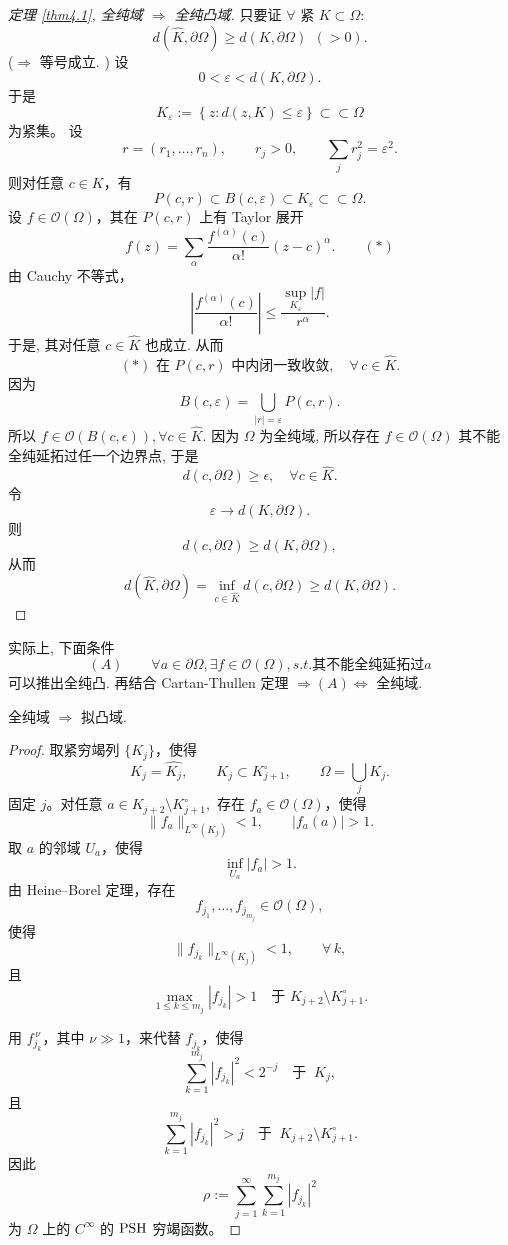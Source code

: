 \begin{proof}[定理 \ref{thm4.1}, 全纯域 $\Rightarrow $ 全纯凸域]
    只要证 $\forall $ 紧 $K \subset \Omega $: 
    $$ d(\hat{K},\partial \Omega )  \geq d(K,\partial \Omega )~~ (>0) .$$
    ($\Rightarrow $ 等号成立. )   
    设
\[
0<\varepsilon<d(K,\partial\Omega).
\]
于是
\[
K_\varepsilon
:=
\left\{
z:d(z,K)\leq\varepsilon
\right\}
\subset\subset\Omega
\]
为紧集。
设
\[
r=(r_1,\ldots,r_n),
\qquad
r_j>0,
\qquad
\sum_j r_j^2=\varepsilon^2.
\]
则对任意 \(c\in K\)，有
\[
P(c,r)\subset B(c,\varepsilon)\subset K_\varepsilon \subset \subset\Omega.
\]
设 \(f\in\mathcal{O}(\Omega)\)，其在 \(P(c,r)\) 上有 Taylor 展开
\[
f(z)
=
\sum_\alpha
\frac{f^{(\alpha)}(c)}{\alpha!}(z-c)^\alpha.
\qquad (*)
\]
由 Cauchy 不等式，
\[
\left|
\frac{f^{(\alpha)}(c)}{\alpha!}
\right|
\leq
\frac{\sup_{K_\varepsilon}|f|}{r^\alpha}.
\]
于是, 其对任意 \(c\in\widehat{K}\) 也成立. 从而
\[
(*)\text{ 在 }P(c,r)\text{ 中内闭一致收敛},
\quad
\forall\,c\in\widehat{K}.
\]
因为
\[
B(c,\varepsilon)
=
\bigcup_{|r|=\varepsilon}P(c,r).
\]
所以 $f \in \mathcal{O}(B(c,\epsilon )), \forall c \in \hat{K}$. 因为 $\Omega $ 为全纯域, 所以存在 $f \in \mathcal{O}(\Omega )$ 其不能全纯延拓过任一个边界点, 于是 
$$ d(c,\partial \Omega ) \geq \epsilon , \quad \forall c \in \hat{K}. $$  
令
\[
\varepsilon \to  d(K,\partial\Omega).
\]
则
\[
d(c,\partial\Omega)\geq d(K,\partial\Omega),
\]
从而
\[
d(\widehat{K},\partial\Omega)
=
\inf_{c\in\widehat{K}} d(c,\partial\Omega)
\geq
d(K,\partial\Omega).
\]
\end{proof}

\begin{remark}
    实际上, 下面条件 
    $$ (A) \qquad \forall a \in \partial \Omega , \exists f \in \mathcal{O}(\Omega ), s.t. \text{其不能全纯延拓过} a $$
    可以推出全纯凸. 再结合 Cartan-Thullen 定理 $\Rightarrow (A) \iff $ 全纯域. 
\end{remark}

\begin{proposition}
    全纯域 $\Rightarrow $ 拟凸域. 
\end{proposition}
\begin{proof}
取紧穷竭列 \(\{K_j\}\)，使得
\[
K_j=\widehat{K_j},
\qquad
K_j\subset K_{j+1}^{\circ},
\qquad
\Omega=\bigcup_j K_j.
\]
固定 \(j\)。对任意
\(
a\in K_{j+2}\setminus K_{j+1}^{\circ},
\)
存在 \(f_a\in\mathcal{O}(\Omega)\)，使得
\[
\|f_a\|_{L^\infty(K_j)}<1,
\qquad
|f_a(a)|>1.
\]
取 \(a\) 的邻域 \(U_a\)，使得
\[
\inf_{U_a}|f_a|>1.
\]
由 Heine--Borel 定理，存在
\[
f_{j_1},\ldots,f_{j_{m_j}}\in\mathcal{O}(\Omega),
\]
使得
\[
\|f_{j_k}\|_{L^\infty(K_j)}<1,
\qquad \forall\,k,
\]
且
\[
\max_{1\leq k\leq m_j}|f_{j_k}|>1
\quad\text{于 }K_{j+2}\setminus K_{j+1}^{\circ}.
\]

用 \(f_{j_k}^{\,\nu}\)，其中 \(\nu\gg1\)，来代替 \(f_{j_k}\)，使得
\[
\sum_{k=1}^{m_j}|f_{j_k}|^2<2^{-j}
\quad\text{于 }~K_j,
\]
且
\[
\sum_{k=1}^{m_j}|f_{j_k}|^2>j
\quad\text{于 }~K_{j+2}\setminus K_{j+1}^{\circ}.
\]
因此
\[
\rho
:=
\sum_{j=1}^{\infty}
\sum_{k=1}^{m_j}|f_{j_k}|^2
\]
为 \(\Omega\) 上的 \(C^\infty\)  的 $\operatorname{PSH}$  穷竭函数。
\end{proof}


